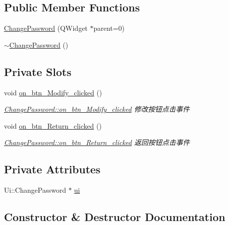 \subsection*{Public Member Functions}
\begin{DoxyCompactItemize}
\item 
\mbox{\hyperlink{class_change_password_adeb8efb7a6b16c42d3856e6ad3976971}{Change\+Password}} (Q\+Widget $\ast$parent=0)
\item 
\mbox{\hyperlink{class_change_password_a3404eee74b7fefaf62698f71c53f9fca}{$\sim$\+Change\+Password}} ()
\end{DoxyCompactItemize}
\subsection*{Private Slots}
\begin{DoxyCompactItemize}
\item 
void \mbox{\hyperlink{class_change_password_a818333a3c3fbeb476314f5624016ba1e}{on\+\_\+btn\+\_\+\+Modify\+\_\+clicked}} ()
\begin{DoxyCompactList}\small\item\em \mbox{\hyperlink{class_change_password_a818333a3c3fbeb476314f5624016ba1e}{Change\+Password\+::on\+\_\+btn\+\_\+\+Modify\+\_\+clicked}} 修改按钮点击事件 \end{DoxyCompactList}\item 
void \mbox{\hyperlink{class_change_password_a84a88a0c8c00284e8c03ee4cbe748d45}{on\+\_\+btn\+\_\+\+Return\+\_\+clicked}} ()
\begin{DoxyCompactList}\small\item\em \mbox{\hyperlink{class_change_password_a84a88a0c8c00284e8c03ee4cbe748d45}{Change\+Password\+::on\+\_\+btn\+\_\+\+Return\+\_\+clicked}} 返回按钮点击事件 \end{DoxyCompactList}\end{DoxyCompactItemize}
\subsection*{Private Attributes}
\begin{DoxyCompactItemize}
\item 
Ui\+::\+Change\+Password $\ast$ \mbox{\hyperlink{class_change_password_a57744b8d5341971b053cac27b66f923c}{ui}}
\end{DoxyCompactItemize}


\subsection{Constructor \& Destructor Documentation}
\mbox{\label{class_change_password_adeb8efb7a6b16c42d3856e6ad3976971}} 

